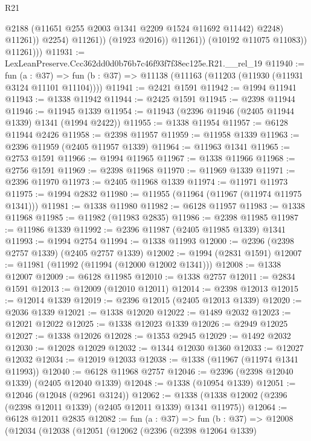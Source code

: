 \begin{lexlean}{R21}
\begin{coremodule}
                              @2188
                              (@11651 @255 @2003 @1341 @2209 @1524 @11692 @11442)
                              @2248)
                            @11261))
                        @2254)
                      @11261))
                  (@1923 @2016))
                @11261))
            (@10192 @11075 @11083))
          @11261)))
@11931 := LexLeanPreserve.Ccc362dd0d0b76b7c46f93f7f38ec125e.R21.__rel_19
@11940 := fun (a : @37) =>
  fun (b : @37) => @11138 (@11163 (@11203 (@11930 (@11931 @3124 @11101 @11104))))
@11941 := @2421 @1591
@11942 := @1994 @11941
@11943 := @1338 @11942
@11944 := @2425 @1591
@11945 := @2398 @11944
@11946 := @11945 @1339
@11954 := @11943 (@2396 @11946 (@2405 @11944 @1339) @1341 (@1994 @2422))
@11955 := @1338 @11954
@11957 := @6128 @11944 @2426
@11958 := @2398 @11957
@11959 := @11958 @1339
@11963 := @2396 @11959 (@2405 @11957 @1339)
@11964 := @11963 @1341
@11965 := @2753 @1591
@11966 := @1994 @11965
@11967 := @1338 @11966
@11968 := @2756 @1591
@11969 := @2398 @11968
@11970 := @11969 @1339
@11971 := @2396 @11970
@11973 := @2405 @11968 @1339
@11974 := @11971 @11973
@11975 := @1994 @2832
@11980 := @11955 (@11964 (@11967 (@11974 @11975 @1341)))
@11981 := @1338 @11980
@11982 := @6128 @11957
@11983 := @1338 @11968
@11985 := @11982 (@11983 @2835)
@11986 := @2398 @11985
@11987 := @11986 @1339
@11992 := @2396 @11987 (@2405 @11985 @1339) @1341
@11993 := @1994 @2754
@11994 := @1338 @11993
@12000 := @2396 (@2398 @2757 @1339) (@2405 @2757 @1339)
@12002 := @1994 (@2831 @1591)
@12007 := @11981 (@11992 (@11994 (@12000 @12002 @1341)))
@12008 := @1338 @12007
@12009 := @6128 @11985
@12010 := @1338 @2757
@12011 := @2834 @1591
@12013 := @12009 (@12010 @12011)
@12014 := @2398 @12013
@12015 := @12014 @1339
@12019 := @2396 @12015 (@2405 @12013 @1339)
@12020 := @2036 @1339
@12021 := @1338 @12020
@12022 := @1489 @2032
@12023 := @12021 @12022
@12025 := @1338 @12023 @1339
@12026 := @2949 @12025
@12027 := @1338 @12026
@12028 := @1353 @2945
@12029 := @1492 @2032
@12030 := @12028 @12029
@12032 := @1344 @12030 @1360
@12033 := @12027 @12032
@12034 := @12019 @12033
@12038 := @1338 (@11967 (@11974 @1341 @11993))
@12040 := @6128 @11968 @2757
@12046 := @2396 (@2398 @12040 @1339) (@2405 @12040 @1339)
@12048 := @1338 (@10954 @1339)
@12051 := @12046 (@12048 (@2961 @3124))
@12062 := @1338 (@1338 @12002 (@2396 (@2398 @12011 @1339) (@2405 @12011 @1339) @1341 @11975))
@12064 := @6128 @12011 @2835
@12082 := fun (a : @37) =>
  fun (b : @37) =>
  @12008
    (@12034
      (@12038
        (@12051
          (@12062
            (@2396
              (@2398 @12064 @1339)

\end{coremodule}
\end{lexlean}
